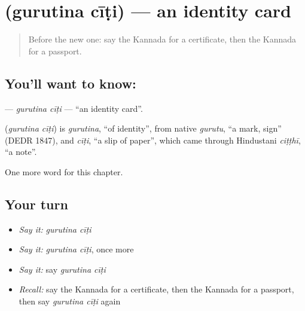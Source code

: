\section[\texorpdfstring{\kn{ಗುರುತಿನ} \kn{ಚೀಟಿ} (gurutina cīṭi)}{ಗುರುತಿನ ಚೀಟಿ (gurutina cīṭi)}]{  (gurutina cīṭi) — an identity card}

\label{lesson:KA-C223-gurutina-citi}



\begin{quote}
Before the new one: say the Kannada for a certificate, then the Kannada for a passport.
\end{quote}

\subsection*{You'll want to know:  }
\textbf{ } — \emph{gurutina cīṭi} — \textquotedblleft{}an identity card\textquotedblright{}.

\begin{cousinweb}
\textbf{ } (\emph{gurutina cīṭi}) is \emph{gurutina}, \textquotedblleft{}of identity\textquotedblright{}, from native \emph{gurutu}, \textquotedblleft{}a mark, sign\textquotedblright{} (DEDR 1847), and \emph{cīṭi}, \textquotedblleft{}a slip of paper\textquotedblright{}, which came through Hindustani \emph{ciṭṭhī}, \textquotedblleft{}a note\textquotedblright{}.
\end{cousinweb}

\begin{grammarlens}[title={What you've built}]
One more word for this chapter.
\end{grammarlens}

\subsection*{Your turn}
\begin{itemize}
\raggedright
  \item \emph{Say it:} \emph{gurutina cīṭi}
  \item \emph{Say it:} \emph{gurutina cīṭi}, once more
  \item \emph{Say it:} say \emph{gurutina cīṭi}
  \item \emph{Recall:} say the Kannada for a certificate, then the Kannada for a passport, then say \emph{gurutina cīṭi} again
\end{itemize}

